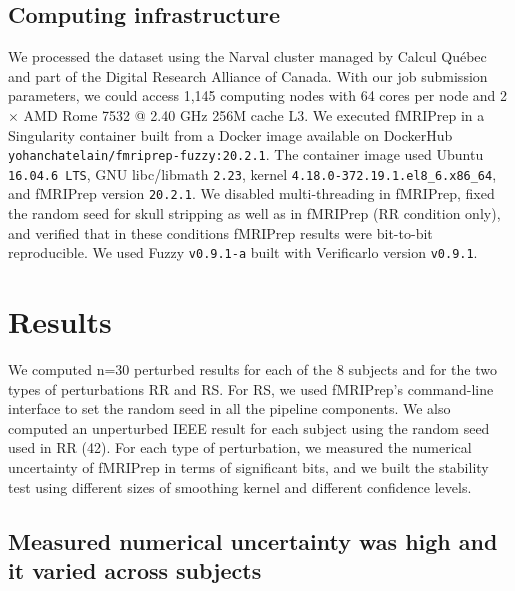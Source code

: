 \documentclass[lettersize,journal]{IEEEtran}
\newcommand{\fmriprep}{fMRIPrep\xspace}
\begin{document}
\subsection{Computing infrastructure}

We processed the dataset using the Narval cluster managed by Calcul Qu\'ebec and part of the Digital Research Alliance of Canada. With our job submission parameters, we could access 1,145 computing nodes with 64 cores per node and 2 $\times$ AMD Rome 7532 @ 2.40 GHz 256M cache L3. We executed \fmriprep in a Singularity container built from a Docker image available on DockerHub \texttt{yohanchatelain/fmriprep-fuzzy:20.2.1}. The container image used Ubuntu \texttt{16.04.6 LTS}, GNU libc/libmath \texttt{2.23}, kernel \texttt{4.18.0-372.19.1}\texttt{.el8\_6.x86\_64}, and fMRIPrep version \texttt{20.2.1}. We disabled multi-threading in fMRIPrep, fixed the random seed for skull stripping as well as in fMRIPrep (RR condition only), and verified that in these conditions fMRIPrep results were bit-to-bit reproducible.
We used Fuzzy \texttt{v0.9.1-a} built with Verificarlo version \texttt{v0.9.1}.

\section{Results}

We computed n=30 perturbed results for each of the 8 subjects and for the two types of perturbations RR and RS. For RS, we used \fmriprep's command-line interface to set the random seed in all the pipeline components. We also computed an unperturbed IEEE result for each subject using the random seed used in RR (42). For each type of perturbation, we measured the numerical uncertainty of fMRIPrep in terms of significant bits, and we built the stability test using different sizes of smoothing kernel and different confidence levels.

\subsection{Measured numerical uncertainty was high and it varied across subjects}
\end{document}
